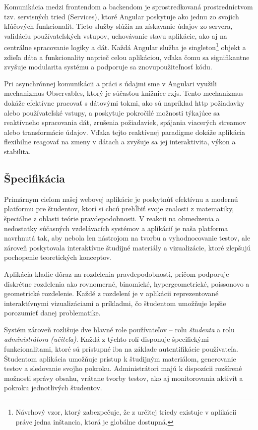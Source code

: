 Komunikácia medzi frontendom a backendom je sprostredkovaná prostredníctvom tzv. servisných tried (Services), ktoré Angular poskytuje ako jednu zo svojich kľúčových funkcionalít. Tieto služby slúžia na získavanie údajov zo servera, validáciu používateľských vstupov, uchovávanie stavu aplikácie, ako aj na centrálne spracovanie logiky a dát. Každá Angular služba je singleton\footnote{Návrhový vzor, ktorý zabezpečuje, že z určitej triedy existuje v aplikácii práve jedna inštancia, ktorá je globálne dostupná.} objekt a zdieľa dáta a funkcionality naprieč celou aplikáciou, vďaka čomu sa signifikantne zvyšuje modularita systému a podporuje sa znovupoužiteľnosť kódu.

Pri asynchrónnej komunikácii a práci s údajmi sme v Angulari využili mechanizmus Observables, ktorý je súčasťou knižnice \acrshort{rxjs}. Tento mechanizmus dokáže efektívne pracovať s dátovými tokmi, ako sú napríklad \acrshort{http} požiadavky alebo používateľské vstupy, a poskytuje pokročilé možnosti týkajúce sa reaktívneho spracovania dát, zrušenia požiadaviek, spájania viacerých streamov alebo transformácie údajov. Vďaka tejto reaktívnej paradigme dokáže aplikácia flexibilne reagovať na zmeny v dátach a zvyšuje sa jej interaktivita, výkon a stabilita.


\subsection{Špecifikácia}
Primárnym cieľom našej webovej aplikácie je poskytnúť efektívnu a modernú platformu pre študentov, ktorí si chcú prehĺbiť svoje znalosti z matematiky, špeciálne z oblasti teórie pravdepodobnosti.
 V reakcii na obmedzenia a nedostatky súčasných vzdelávacích systémov a aplikácií je naša platforma navrhnutá tak, aby nebola len nástrojom na tvorbu a vyhodnocovanie testov, ale zároveň poskytovala interaktívne študijné materiály a vizualizácie, ktoré zlepšujú pochopenie teoretických konceptov.

Aplikácia kladie dôraz na rozdelenia pravdepodobnosti, pričom podporuje diskrétne rozdelenia ako rovnomerné, binomické, hypergeometrické, poissonovo a geometrické rozdelenie.
 Každé z rozdelení je v aplikácii reprezentované interaktívnymi vizualizáciami a príkladmi, čo študentom umožňuje lepšie porozumieť danej problematike.

Systém zároveň rozlišuje dve hlavné role používateľov – rolu \textit{študenta} a rolu \textit{administrátora (učiteľa)}. Každá z týchto rolí disponuje špecifickými funkcionalitami, ktoré sú prístupné iba na základe autentifikácie používateľa.
 Študentom aplikácia umožňuje prístup k študijným materiálom, generovanie testov a sledovanie svojho pokroku.
  Administrátori majú k dispozícii rozšírené možnosti správy obsahu, vrátane tvorby testov, ako aj monitorovania aktivít a pokroku jednotlivých študentov.

